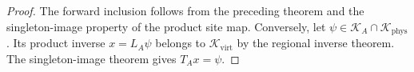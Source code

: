 \begin{proof}\leanok
    The forward inclusion follows from the preceding theorem and
    the singleton-image property of the product site map.
    Conversely, let $\psi\in\mathcal K_A\cap\mathcal K_{\mathrm{phys}}$.
    Its product inverse $x=L_A\psi$ belongs to
    $\mathcal K_{\mathrm{virt}}$ by the regional inverse theorem.
    The singleton-image theorem gives $T_Ax=\psi$.
\end{proof}

